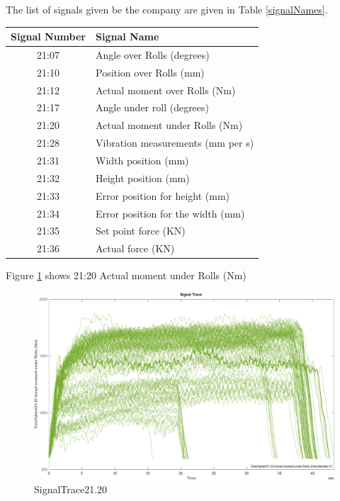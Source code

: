 \documentclass{article}
\begin{document}
The list of signals given be the company are given in Table \ref{signalNames}.
\begin{center}
\begin{tabular}{ |c|l| }
 \hline
 Signal Number & Signal Name \\ 
 \hline
21:07 & Angle over Rolls (degrees) \\
 \hline
21:10 & Position over Rolls (mm) \\
 \hline
21:12 & Actual moment over Rolls (Nm) \\
 \hline
21:17 & Angle under roll (degrees) \\
 \hline
21:20 & Actual moment under Rolls (Nm) \\
 \hline
21:28 & Vibration measurements (mm per s) \\ 
 \hline              
21:31 & Width position (mm) \\
 \hline
21:32 & Height position (mm) \\
 \hline
21:33 & Error position for height (mm) \\
 \hline
21:34 & Error position for the width (mm) \\
 \hline
21:35 & Set point force (KN) \\
 \hline
21:36 & Actual force (KN) \\
 \hline
\end{tabular}
\label{signalNames}
\end{center}

Figure \ref{fig:SignalTrace21.20} shows 21:20 Actual moment under Rolls (Nm)

\begin{figure}[!ht]
    \centering
    \includegraphics[width=\textwidth, height=\textheight, keepaspectratio]{figures/SignalTrace21.20.png}
    \caption{SignalTrace21.20}
    \label{fig:SignalTrace21.20}
\end{figure}
\end{document}
